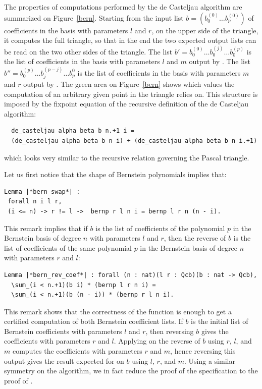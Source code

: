 \documentclass{mscs}
\begin{document}
The properties of computations performed by the de Casteljau algorithm
are summarized on Figure~\ref{bern}. Starting from the input list
$b = (b_0^{(0)}\dots b_p^{(0)})$ of coefficients in the basis with
parameters $l$ and $r$, on the upper side of the triangle, it
computes the full triangle, so that in the end the two expected output
lists can be read on the two  other sides of the triangle. The list
$b' = b_0^{(0)} \dots b_0^{(j)} \dots b_0^{(p)}$ is the list of
coefficients in the basis with parameters $l$ and $m$ output by
. The list
$b'' = b_0^{(p)} \dots b_j^{(p - j)} \dots b_p^{0}$
 is the list of coefficients in the basis with parameters $m$ and $r$
 output by .  The green area on Figure~\ref{bern} shows which values
the computation of an arbitrary given point in the triangle relies on.
This structure is imposed by the fixpoint
 equation of the recursive definition of the de Casteljau algorithm:
\begin{lstlisting}
  de_casteljau alpha beta b n.+1 i =
  (de_casteljau alpha beta b n i) + (de_casteljau alpha beta b n i.+1)
\end{lstlisting}
which looks very similar to the recursive relation governing the
Pascal triangle.

Let us first notice that the shape of Bernstein polynomials implies
that:
\begin{lstlisting}
Lemma |*bern_swap*| :
 forall n i l r,
 (i <= n) -> r != l ->  bernp r l n i = bernp l r n (n - i).
\end{lstlisting}
This remark implies that if $b$ is the list of coefficients of the
polynomial $p$ in the Bernstein basis of degree $n$ with parameters
$l$ and $r$, then the reverse of $b$ is the list of coefficients of
the same polynomial $p$ in the Bernstein basis of degree $n$ with
parameters $r$ and $l$:

\begin{lstlisting}
Lemma |*bern_rev_coef*| : forall (n : nat)(l r : Qcb)(b : nat -> Qcb),
  \sum_(i < n.+1)(b i) * (bernp l r n i) =
  \sum_(i < n.+1)(b (n - i)) * (bernp r l n i).
\end{lstlisting}
This remark shows that the correctness of the  function is
enough to get a certified computation of both Bernstein coefficient
lists.  If $b$ is the
initial list of Bernstein coefficients with parameters $l$ and $r$, then
reversing $b$ gives the  coefficients with parameters $r$ and $l$.
Applying  on the reverse of $b$ using $r$, $l$, and $m$
computes the coefficients with parameters $r$ and $m$, hence reversing
this output gives the result expected for  on $b$ using $l$,
$r$, and $m$. Using a similar symmetry on the
 algorithm, we in fact reduce the proof of the
 specification to the proof of .
\end{document}
